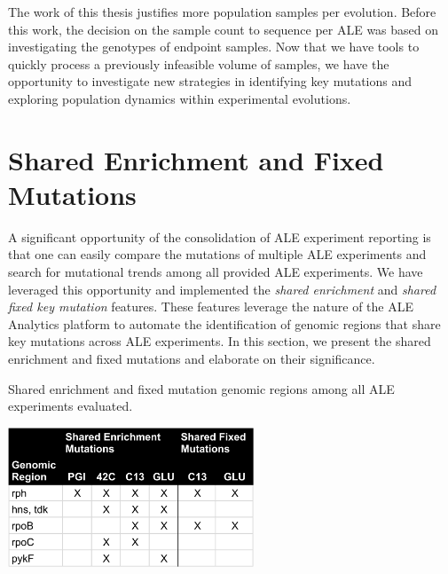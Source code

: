 \documentclass[12pt,final,masters,chapterheads]{ucsd}  %
\begin{document}
The work of this thesis justifies more population samples per evolution. Before this work, the decision on the sample count to sequence per ALE was based on investigating the genotypes of endpoint samples. Now that we have tools to quickly process a previously infeasible volume of samples, we have the opportunity to investigate new strategies in identifying key mutations and exploring population dynamics within experimental evolutions.
\section{Shared Enrichment and Fixed Mutations}
A significant opportunity of the consolidation of ALE experiment reporting is that one can easily compare the mutations of multiple ALE experiments and search for mutational trends among all provided ALE experiments. We have leveraged this opportunity and implemented the \textit{shared enrichment} and \textit{shared fixed key mutation} features. These features leverage the nature of the ALE Analytics platform to automate the identification of genomic regions that share key mutations across ALE experiments. In this section, we present the shared enrichment and fixed mutations and elaborate on their significance.%
\begin{table}[H]
  \caption{Shared enrichment and fixed mutation genomic regions among all ALE experiments evaluated.}
  \centering
  \includegraphics[width=0.55\textwidth]{shared_enrichment_fixed_genomic_regions.png}
\end{table}
\end{document}
